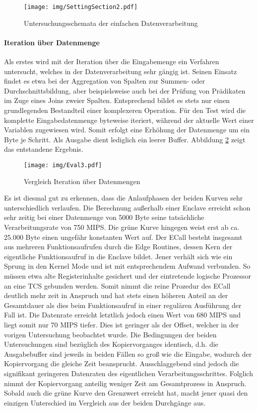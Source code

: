 \begin{figure}[h]
	\texttt{[image: img/SettingSection2.pdf]}
	\centering
	\caption{Untersuchungsschemata der einfachen Datenverarbeitung}
	\label{fig:settingsection2}
\end{figure}

\paragraph{Iteration über Datenmenge}

Als erstes wird mit der Iteration über die Eingabemenge ein Verfahren untersucht, welches in der Datenverarbeitung sehr gängig ist. Seinen Einsatz findet es etwa bei der Aggregation von Spalten zur Summen- oder Durchschnittsbildung, aber beispielsweise auch bei der Prüfung von Prädikaten im Zuge eines Joins zweier Spalten. Entsprechend bildet es stets nur einen grundlegenden Bestandteil einer komplexeren Operation. Für den Test wird die komplette Eingabedatenmenge byteweise iteriert, während der aktuelle Wert einer Variablen zugewiesen wird. Somit erfolgt eine Erhöhung der Datenmenge um ein Byte je Schritt. Als Ausgabe dient lediglich ein leerer Buffer. Abbildung \ref{fig:eval3} zeigt das entstandene Ergebnis.

\begin{figure}[h]
	\texttt{[image: img/Eval3.pdf]}
	\centering
	\caption{Vergleich Iteration über Datenmengen}
	\label{fig:eval3}
\end{figure}

Es ist diesmal gut zu erkennen, dass die Anlaufphasen der beiden Kurven sehr unterschiedlich verlaufen. Die Berechnung außerhalb einer Enclave erreicht schon sehr zeitig bei einer Datenmenge von 5000 Byte seine tatsächliche Verarbeitungsrate von 750 \ac{MIPS}. Die grüne Kurve hingegen weist erst ab ca. 25.000 Byte einen ungefähr konstanten Wert auf. Der \ac{ECall} besteht insgesamt aus mehreren Funktionsaufrufen durch die Edge Routines, dessen Kern der eigentliche Funktionsaufruf in die Enclave bildet. Jener verhält sich wie ein Sprung in den Kernel Mode und ist mit entsprechendem Aufwand verbunden. So müssen etwa alte Registerinhalte gesichert und der eintretende logische Prozessor an eine \ac{TCS} gebunden werden. Somit nimmt die reine Prozedur des \ac{ECall} deutlich mehr zeit in Anspruch und hat stets einen höheren Anteil an der Gesamtdauer als dies beim Funktionsaufruf in einer regulären Ausführung der Fall ist. Die Datenrate erreicht letztlich jedoch einen Wert von 680 \ac{MIPS} und liegt somit nur 70 \ac{MIPS} tiefer. Dies ist geringer als der Offset, welcher in der vorigen Untersuchung beobachtet wurde. Die Bedingungen der beiden Untersuchungen sind bezüglich des Kopiervorganges identisch, d.h. die Ausgabebuffer sind jeweils in beiden Fällen so groß wie die Eingabe, wodurch der Kopiervorgang die gleiche Zeit beansprucht. Ausschlaggebend sind jedoch die signifikant geringeren Datenraten des eigentlichen Verarbeitungsschrittes. Folglich nimmt der Kopiervorgang anteilig weniger Zeit am Gesamtprozess in Anspruch. Sobald auch die grüne Kurve den Grenzwert erreicht hat, macht jener quasi den einzigen Unterschied im Vergleich aus der beiden Durchgänge aus.

